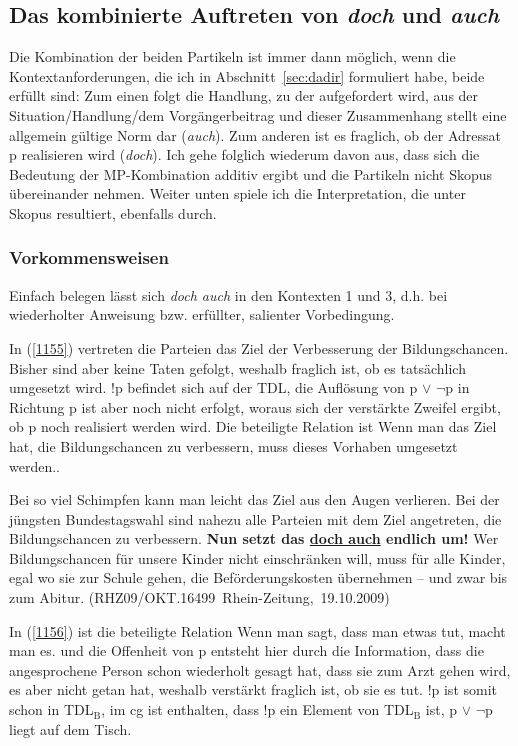 {\subsection{Das kombinierte Auftreten von \textit{doch} und \textit{auch}}
\label{sec:kombida}
Die Kombination der beiden Partikeln ist immer dann möglich, wenn die Kontextanforderungen, die ich in Abschnitt~\ref{sec:dadir} formuliert habe, beide erfüllt sind: Zum einen folgt die Handlung, zu der aufgefordert wird, aus der Situation/Handlung/dem Vorgängerbeitrag und dieser Zusammenhang stellt eine allgemein gültige Norm dar (\textit{auch}). Zum anderen ist es fraglich, ob der Adressat p realisieren wird (\textit{doch}). Ich gehe folglich wiederum davon aus, dass sich die Bedeutung der MP-Kombination additiv ergibt und die Partikeln nicht Skopus  übereinander nehmen. Weiter unten spiele ich die Interpretation, die unter Skopus resultiert, ebenfalls durch.

\subsubsection{Vorkommensweisen}
Einfach belegen lässt sich \textit{doch auch} in den Kontexten 1 und 3, d.h. bei wiederholter Anweisung bzw. erfüllter, salienter Vorbedingung.

In (\ref{1155}) vertreten die Parteien das Ziel der Verbesserung der Bildungschancen. Bisher sind aber keine Taten gefolgt, weshalb fraglich ist, ob es tatsächlich umgesetzt wird. !p befindet sich auf der TDL, die Auflösung von p $\vee$ $\neg$p in Richtung p ist aber noch nicht erfolgt, woraus sich der verstärkte Zweifel ergibt, ob p noch realisiert werden wird. Die beteiligte Relation ist \glq Wenn man das Ziel hat, die Bildungschancen zu verbessern, muss dieses Vorhaben umgesetzt werden.\grq {}.

\begin{exe}
	\ex\label{1155} 
	\scriptsize
	Bei so viel Schimpfen kann man leicht das Ziel aus den Augen verlieren. Bei der jüngsten Bundestagswahl sind nahezu alle Parteien mit dem Ziel 				angetreten, die Bildungschancen zu verbessern. \textbf{Nun setzt das \underline{doch auch} endlich um!} Wer Bildungschancen für unsere Kinder nicht 		einschränken will, muss für alle Kinder, egal wo sie zur Schule gehen, die Beförderungskosten übernehmen – und zwar bis zum Abitur. 		
	\hfill\hbox{(RHZ09/OKT.16499 Rhein-Zeitung, 19.10.2009)}
\end{exe}
In (\ref{1156}) ist die beteiligte Relation \glq Wenn man sagt, dass man etwas tut, macht man es.\grq {} und die Offenheit von p entsteht hier durch die Information, dass die angesprochene Person schon wiederholt gesagt hat, dass sie zum Arzt gehen wird, es aber nicht getan hat, weshalb verstärkt fraglich ist, ob sie es tut. !p ist somit schon in TDL$_{\textrm{B}}$, im cg ist enthalten, dass !p ein Element von TDL$_{\textrm{B}}$ ist, p $\vee$ $\neg$p liegt auf dem Tisch.

}
